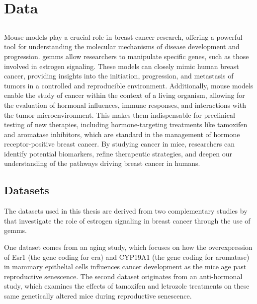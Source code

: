 \section{Data}
\label{sec:data}

\subsection{}
\label{sec:mouse_models}
Mouse models play a crucial role in breast cancer research, offering a powerful
tool for understanding the molecular mechanisms of disease development and
progression.
\Glspl{gemm} allow researchers to manipulate specific genes, such as those
involved in estrogen signaling\supercite{park_mouse_2018}.
These models can closely mimic human breast cancer, providing insights into the
initiation, progression, and metastasis of tumors in a controlled and
reproducible environment\supercite{pfefferle_transcriptomic_2013}.
Additionally, mouse models enable the study of cancer within the context of a
living organism, allowing for the evaluation of hormonal influences, immune
responses, and interactions with the tumor
microenvironment\supercite{manning_mouse_2016}.
This makes them indispensable for preclinical testing of new therapies,
including hormone-targeting treatments like tamoxifen and aromatase inhibitors,
which are standard in the management of hormone receptor-positive breast
cancer\supercite{fan_endocrine_2015,yin_disruption_2014}.
By studying cancer in mice, researchers can identify potential biomarkers,
refine therapeutic strategies, and deepen our understanding of the pathways
driving breast cancer in humans\supercite{peterson_amphiregulin_2015}.

\subsection{Datasets}
\label{sec:datasets}
The datasets used in this thesis are derived from two complementary studies by
\textcite{furth_esr1_2023,furth_overexpression_2023} that investigate the role
of estrogen signaling in breast cancer through the use of \glspl{gemm}.

One dataset comes from an aging study, which focuses on how the overexpression
of Esr1 (the gene coding for \gls{era}) and CYP19A1 (the gene coding for
aromatase) in mammary epithelial cells influences cancer development as the
mice age past reproductive senescence.
The second dataset originates from an anti-hormonal study, which examines the
effects of tamoxifen and letrozole treatments on these same genetically altered
mice during reproductive senescence.

